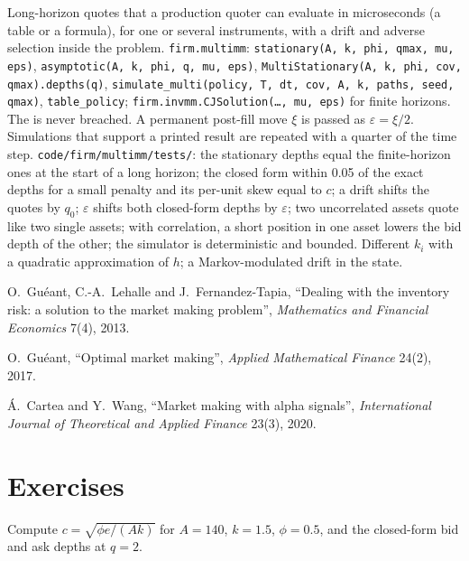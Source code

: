 \begin{build}
 Long-horizon quotes that a production quoter can evaluate in microseconds (a table or a formula), for one or several instruments,
with a drift and adverse selection inside the problem.
 \texttt{firm.multimm}: \texttt{stationary(A, k, phi, qmax, mu, eps)}, \texttt{asymptotic(A, k, phi, q, mu, eps)},
\texttt{MultiStationary(A, k, phi, cov, qmax).depths(q)}, \texttt{simulate\_multi(policy, T, dt, cov, A, k, paths, seed, qmax)},
\texttt{table\_policy}; \texttt{firm.invmm.CJSolution(\dots, mu, eps)} for finite horizons.
 The  is never breached. A permanent post-fill move $\xi$ is passed as $\varepsilon=\xi/2$. Simulations that support a
printed result are repeated with a quarter of the time step.
 \texttt{code/firm/multimm/tests/}: the stationary depths equal the finite-horizon ones at the start of a long horizon; the
closed form within 0.05 of the exact depths for a small penalty and its per-unit skew equal to $c$; a drift shifts the quotes by $q_0$; $\varepsilon$
shifts both closed-form depths by $\varepsilon$; two uncorrelated assets quote like two single assets; with correlation, a short position in one
asset lowers the bid depth of the other; the simulator is deterministic and bounded.
 Different $k_i$ with a quadratic approximation of $h$; a Markov-modulated drift in the state.
\end{build}

\begin{omsources}
\item O.~Guéant, C.-A.~Lehalle and J.~Fernandez-Tapia, ``Dealing with the inventory risk: a solution to the market making problem'',
\emph{Mathematics and Financial Economics} 7(4), 2013.
\item O.~Guéant, ``Optimal market making'', \emph{Applied Mathematical Finance} 24(2), 2017.
\item \'A.~Cartea and Y.~Wang, ``Market making with alpha signals'', \emph{International Journal of Theoretical and Applied Finance} 23(3), 2020.
\end{omsources}

\section{Exercises}

\begin{exercise}[$\star$]\label{exo:hf:extensions-of-the-inventory-framework:1}
Compute $c=\sqrt{\phi e/(Ak)}$ for $A=140$, $k=1.5$, $\phi=0.5$, and the closed-form bid and ask depths at $q=2$.
\end{exercise}

